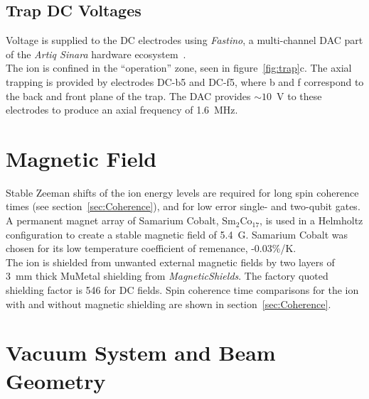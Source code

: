 \subsection{Trap DC Voltages}
    Voltage is supplied to the DC electrodes using \emph{Fastino}, a
    multi-channel DAC part of the \emph{Artiq Sinara} hardware
    ecosystem~\cite{}.\\
    The ion is confined in the ``operation'' zone, seen in
    figure~\ref{fig:trap}c. The axial trapping is provided by electrodes
    DC-b5 and DC-f5, where b and f correspond to the back and front plane of the trap. 
    The DAC provides $\sim 10$~V to these electrodes to produce an axial frequency of 1.6~MHz.
    
\section{Magnetic Field}
\label{sec:Magnetic Field}
    Stable Zeeman shifts of the ion energy levels are required for long spin
    coherence times (see section~\ref{sec:Coherence}), and for low error single-
    and two-qubit gates. A permanent magnet array of Samarium Cobalt,
    Sm$_2$Co$_17$, is used in a Helmholtz configuration to create a stable magnetic
    field of 5.4~G. Samarium Cobalt was chosen for its low temperature
    coefficient of remenance, -0.03\%/K.\\
    The ion is shielded from unwanted external magnetic fields by two layers of
    3~mm thick MuMetal shielding from \emph{MagneticShields}. The factory quoted
    shielding factor is 546 for DC fields. Spin coherence time comparisons for
    the ion with and without magnetic shielding are shown in
    section~\ref{sec:Coherence}.\\

\section{Vacuum System and Beam Geometry}
\label{sec:Vacuum System}


